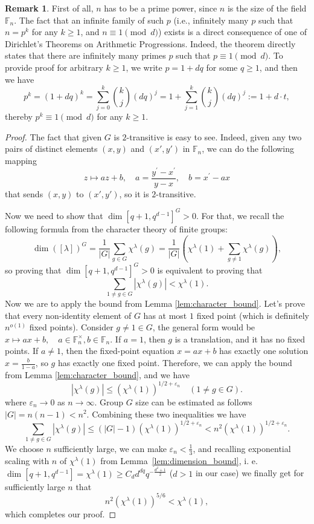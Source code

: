\documentclass[11pt,letterpaper]{article}
\theoremstyle{plain}
\theoremstyle{plain}
\theoremstyle{plain}
\theoremstyle{plain}
\theoremstyle{plain}
\theoremstyle{plain}
\theoremstyle{plain}
\theoremstyle{definition}
\newtheorem{smremark}[smtheorem]{Remark}
\theoremstyle{plain}
\begin{document}
\begin{smremark} \label{rem:infinitely_many_primes}
    First of all, $n$ has to be a prime power, since $n$ is the size of the field $\mathbb{F}_{n}$. 
    The fact that an infinite family of such $p$ (i.e., infinitely many $p$ such that $n=p^k$ for any $k\geq 1$, and $n\equiv 1 \pmod{d}$) exists is a direct consequence of one of Dirichlet's 
    Theorems on Arithmetic Progressions.
    Indeed, the theorem directly states that there are infinitely many primes $p$ such that $p \equiv 1 \pmod{d}$.
    To provide proof for arbitrary $k\geq 1$, we write $p=1+d q$ for some $q\geq 1$, and then we have
    \[
        p^k=(1+d q)^k=\sum_{j=0}^k\binom{k}{j}(d q)^j=1+\sum_{j=1}^k\binom{k}{j}(d q)^j := 1+d \cdot t,
    \]
    thereby $p^k \equiv 1 \pmod{d}$ for any $k\geq 1$.
\end{smremark}

\begin{proof}
The fact that given $G$ is $2$-transitive is easy to see. Indeed, given any two pairs of distinct elements $(x, y)$ and $(x', y')$ in $\mathbb{F}_n$, we can do the following mapping
\[
    z \mapsto a z+b, \quad a=\frac{y^{\prime}-x^{\prime}}{y-x}, \quad b=x^{\prime}-a x
\]
that sends $(x, y)$ to $(x', y')$, so it is $2$-transitive.

Now we need to show that $\dim [q+1, q^{d-1}]^G > 0$. For that, we recall the following formula from the character theory of finite groups:
\[
    \operatorname{dim}\left([\lambda]\right)^G=\frac{1}{|G|} \sum_{g \in G} \chi^\lambda(g)=\frac{1}{|G|}\left(\chi^\lambda(1)+\sum_{g \neq 1}\chi^\lambda(g) \right),
\]
so proving that $\dim [q+1, q^{d-1}]^G > 0$ is equivalent to proving that
\[
    \sum_{1 \neq g \in G}\left|\chi^\lambda(g)\right|<\chi^\lambda(1).
\]
Now we are to apply the bound from Lemma \ref{lem:character_bound}. Let's
prove that every non-identity element of $G$ has at most $1$ fixed point (which is definitely $n^{o(1)}$ fixed points).
Consider $g\neq 1 \in G$, the general form would be $x \mapsto a x+b, \quad a \in \mathbb{F}_n^{\times}, b \in \mathbb{F}_n$. 
If $a=1$, then $g$ is a translation, and it has no fixed points. If $a \neq 1$, then the fixed-point equation $x=a x+b$ has exactly one solution $x=\frac{b}{1-a}$, so $g$ has exactly one fixed point.
Therefore, we can apply the bound from Lemma \ref{lem:character_bound}, and we have
\[
    \left|\chi^\lambda(g)\right| \leq\left(\chi^\lambda(1)\right)^{1 / 2+\varepsilon_n} \quad(1 \neq g \in G) .
\]
where $\varepsilon_n \to 0$ as $n \to \infty$. Group $G$ size can be estimated as follows
$
    |G|=n(n-1)<n^2 .
$
Combining these two inequalities we have
\[
    \sum_{1 \neq g \in G}\left|\chi^\lambda(g)\right| \leq(|G|-1)\left(\chi^\lambda(1)\right)^{1 / 2+\varepsilon_n}<n^2\left(\chi^\lambda(1)\right)^{1 / 2+\varepsilon_n} .
\]
We choose $n$ sufficiently large, we can make $\varepsilon_n<\frac{1}{3}$, and recalling exponential scaling with $n$ 
of $\chi^{\lambda}(1)$ from Lemma~\ref{lem:dimension_bound}, i. e. $\dim \left[q+1, q^{d-1}\right]= \chi^\lambda(1) \geq C_d d^{d q} q^{-\frac{d^2+1}{2}}$ 
($d>1$ in our case) we finally get for sufficiently large $n$ that
\[
    n^2\left(\chi^\lambda(1)\right)^{5 / 6}<\chi^\lambda(1),
\]
which completes our proof.
\end{proof}
\end{document}
